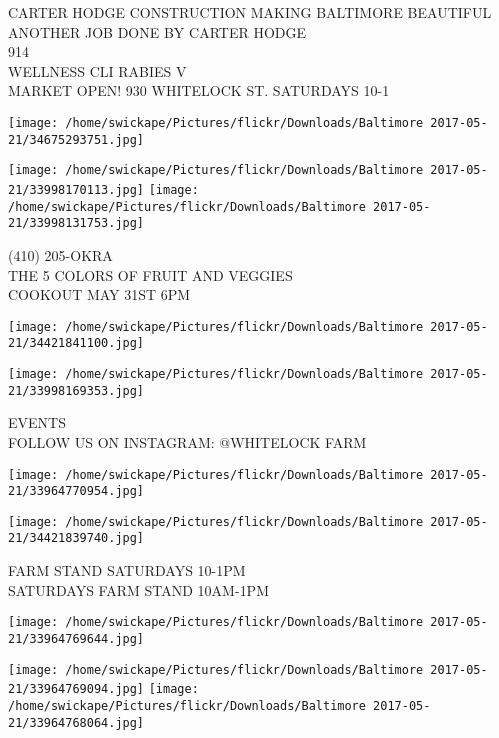 \documentclass[10pt,letterpaper]{article}
\begin{document}
CARTER HODGE CONSTRUCTION MAKING BALTIMORE BEAUTIFUL ANOTHER JOB DONE BY CARTER HODGE\\
914\\
WELLNESS CLI RABIES V\\
MARKET OPEN! 930 WHITELOCK ST. SATURDAYS 10{-}1\\
\pagebreak

\texttt{[image: /home/swickape/Pictures/flickr/Downloads/Baltimore 2017-05-21/34675293751.jpg]}

\vspace{0.25in}
\texttt{[image: /home/swickape/Pictures/flickr/Downloads/Baltimore 2017-05-21/33998170113.jpg]}
\texttt{[image: /home/swickape/Pictures/flickr/Downloads/Baltimore 2017-05-21/33998131753.jpg]}

(410) 205{-}OKRA\\
THE 5 COLORS OF FRUIT AND VEGGIES\\
COOKOUT MAY 31ST 6PM\\
\pagebreak

\texttt{[image: /home/swickape/Pictures/flickr/Downloads/Baltimore 2017-05-21/34421841100.jpg]}

\vspace{0.25in}
\texttt{[image: /home/swickape/Pictures/flickr/Downloads/Baltimore 2017-05-21/33998169353.jpg]}

EVENTS\\
FOLLOW US ON INSTAGRAM: @WHITELOCK FARM\\
\pagebreak

\texttt{[image: /home/swickape/Pictures/flickr/Downloads/Baltimore 2017-05-21/33964770954.jpg]}

\vspace{0.25in}
\texttt{[image: /home/swickape/Pictures/flickr/Downloads/Baltimore 2017-05-21/34421839740.jpg]}

FARM STAND SATURDAYS 10{-}1PM\\
SATURDAYS FARM STAND 10AM{-}1PM\\
\pagebreak

\texttt{[image: /home/swickape/Pictures/flickr/Downloads/Baltimore 2017-05-21/33964769644.jpg]}

\vspace{0.25in}
\texttt{[image: /home/swickape/Pictures/flickr/Downloads/Baltimore 2017-05-21/33964769094.jpg]}
\texttt{[image: /home/swickape/Pictures/flickr/Downloads/Baltimore 2017-05-21/33964768064.jpg]}
\end{document}
